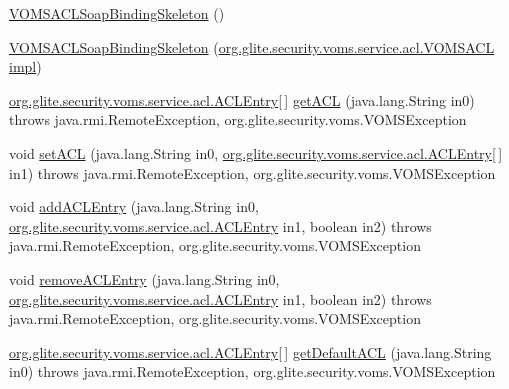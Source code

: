 \begin{DoxyCompactItemize}
\item 
\hyperlink{classorg_1_1glite_1_1security_1_1voms_1_1service_1_1acl_1_1VOMSACLSoapBindingSkeleton_ab944465bb3f4cd1726c7c670b9d629bd}{VOMSACLSoapBindingSkeleton} ()
\item 
\hyperlink{classorg_1_1glite_1_1security_1_1voms_1_1service_1_1acl_1_1VOMSACLSoapBindingSkeleton_aaab55a453a49ab3593729e3ce8e08b0c}{VOMSACLSoapBindingSkeleton} (\hyperlink{interfaceorg_1_1glite_1_1security_1_1voms_1_1service_1_1acl_1_1VOMSACL}{org.glite.security.voms.service.acl.VOMSACL} \hyperlink{classorg_1_1glite_1_1security_1_1voms_1_1service_1_1acl_1_1VOMSACLSoapBindingSkeleton_aa21de9ae9ef8035f7cbf563f0d529814}{impl})
\item 
\hyperlink{classorg_1_1glite_1_1security_1_1voms_1_1service_1_1acl_1_1ACLEntry}{org.glite.security.voms.service.acl.ACLEntry}\mbox{[}$\,$\mbox{]} \hyperlink{classorg_1_1glite_1_1security_1_1voms_1_1service_1_1acl_1_1VOMSACLSoapBindingSkeleton_a2376690324c82b8da581b24a6206b1b1}{getACL} (java.lang.String in0)  throws java.rmi.RemoteException, org.glite.security.voms.VOMSException     
\item 
void \hyperlink{classorg_1_1glite_1_1security_1_1voms_1_1service_1_1acl_1_1VOMSACLSoapBindingSkeleton_a13cf5e855237d038b6e3af31575bbc4f}{setACL} (java.lang.String in0, \hyperlink{classorg_1_1glite_1_1security_1_1voms_1_1service_1_1acl_1_1ACLEntry}{org.glite.security.voms.service.acl.ACLEntry}\mbox{[}$\,$\mbox{]} in1)  throws java.rmi.RemoteException, org.glite.security.voms.VOMSException     
\item 
void \hyperlink{classorg_1_1glite_1_1security_1_1voms_1_1service_1_1acl_1_1VOMSACLSoapBindingSkeleton_a905c526630600245576b8eaa9528c39a}{addACLEntry} (java.lang.String in0, \hyperlink{classorg_1_1glite_1_1security_1_1voms_1_1service_1_1acl_1_1ACLEntry}{org.glite.security.voms.service.acl.ACLEntry} in1, boolean in2)  throws java.rmi.RemoteException, org.glite.security.voms.VOMSException     
\item 
void \hyperlink{classorg_1_1glite_1_1security_1_1voms_1_1service_1_1acl_1_1VOMSACLSoapBindingSkeleton_a3ba7b5cbe7a46997b7610c6d3fcbd744}{removeACLEntry} (java.lang.String in0, \hyperlink{classorg_1_1glite_1_1security_1_1voms_1_1service_1_1acl_1_1ACLEntry}{org.glite.security.voms.service.acl.ACLEntry} in1, boolean in2)  throws java.rmi.RemoteException, org.glite.security.voms.VOMSException     
\item 
\hyperlink{classorg_1_1glite_1_1security_1_1voms_1_1service_1_1acl_1_1ACLEntry}{org.glite.security.voms.service.acl.ACLEntry}\mbox{[}$\,$\mbox{]} \hyperlink{classorg_1_1glite_1_1security_1_1voms_1_1service_1_1acl_1_1VOMSACLSoapBindingSkeleton_aa9415182fdbd31186983e2191210fdbe}{getDefaultACL} (java.lang.String in0)  throws java.rmi.RemoteException, org.glite.security.voms.VOMSException     

\end{DoxyCompactItemize}
